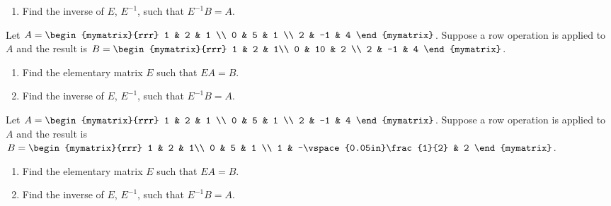 \begin{enumialphparenastyle}
\begin{ex}
\begin{enumerate}
\item Find the inverse of $E$, $E^{-1}$, such that $E^{-1}B = A$.
\end{enumerate}
\end{ex}

\begin{ex} 
Let $A = \begin{mymatrix}{rrr}
1 & 2 & 1  \\
0 & 5 & 1 \\
2 & -1 & 4
\end{mymatrix}$. Suppose a row operation is applied to $A$ and the result is $B = \begin{mymatrix}{rrr}
1 & 2 & 1\\
0 & 10 & 2 \\
2 & -1 & 4  
\end{mymatrix}$. 
\begin{enumerate}
\item Find the elementary matrix $E$ such that $EA = B$. 

\item Find the inverse of $E$, $E^{-1}$, such that $E^{-1}B = A$.
\end{enumerate}
\end{ex}


\begin{ex} 
Let $A = \begin{mymatrix}{rrr}
1 & 2 & 1  \\
0 & 5 & 1 \\
2 & -1 & 4
\end{mymatrix}$. Suppose a row operation is applied to $A$ and the result is $B = \begin{mymatrix}{rrr}
1 & 2 & 1\\
0 & 5 & 1 \\
1 & -\vspace{0.05in}\frac{1}{2} & 2  
\end{mymatrix}$. 
\begin{enumerate}
\item Find the elementary matrix $E$ such that $EA = B$. 

\item Find the inverse of $E$, $E^{-1}$, such that $E^{-1}B = A$.
\end{enumerate}
\end{ex}



\end{enumialphparenastyle}
